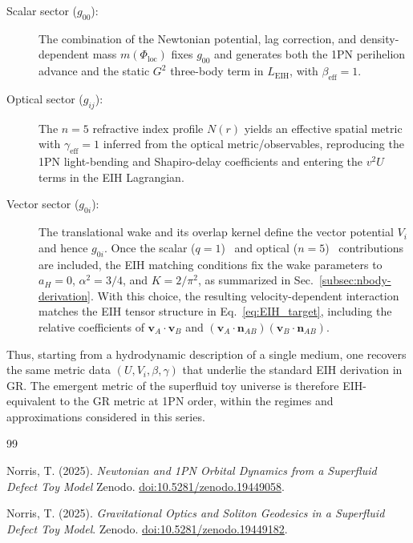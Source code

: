 \documentclass[11pt]{article}
\begin{document}
\begin{description}
  \item[Scalar sector ($g_{00}$):]
    The combination of the Newtonian potential, lag correction, and
    density-dependent mass $m(\Phi_{\text{loc}})$ fixes $g_{00}$ and
    generates both the 1PN perihelion advance and the static $G^2$
    three-body term in $L_{\text{EIH}}$, with $\beta_{\text{eff}}=1$.

  \item[Optical sector ($g_{ij}$):]
    The $n=5$ refractive index profile $N(r)$ yields an effective
    spatial metric with $\gamma_{\text{eff}}=1$ inferred from the optical
    metric/observables, reproducing the 1PN light-bending and
    Shapiro-delay coefficients and entering the $v^2 U$ terms in the
    EIH Lagrangian.

  \item[Vector sector ($g_{0i}$):]
    The translational wake and its overlap kernel define the vector potential
    $V_i$ and hence $g_{0i}$. Once the scalar ($q=1$)~\cite{Norris:2025Orbits} and optical
    ($n=5$)~\cite{Norris:Paper2} contributions are included, the EIH matching conditions
    fix the wake parameters to $a_H=0$, $\alpha^2=3/4$, and $K=2/\pi^2$, as
    summarized in Sec.~\ref{subsec:nbody-derivation}. With this choice, the
    resulting velocity-dependent interaction matches the EIH tensor structure
    in Eq.~\eqref{eq:EIH_target}, including the relative coefficients of
    $\mathbf{v}_A\cdot\mathbf{v}_B$ and
    $(\mathbf{v}_A\cdot\mathbf{n}_{AB})(\mathbf{v}_B\cdot\mathbf{n}_{AB})$.
\end{description}

Thus, starting from a hydrodynamic description of a single medium,
one recovers the same metric data $(U,V_i,\beta,\gamma)$ that
underlie the standard EIH derivation in GR.
The emergent metric of the superfluid toy universe is therefore
EIH-equivalent to the GR metric at 1PN order, within the regimes and
approximations considered in this series.

\begin{thebibliography}{99}

Norris, T. (2025).
\newblock \emph{Newtonian and 1PN Orbital Dynamics from a Superfluid Defect Toy Model}
\newblock Zenodo.
\newblock \href{https://doi.org/10.5281/zenodo.19449058}{doi:10.5281/zenodo.19449058}.

Norris, T. (2025).
\newblock \emph{Gravitational Optics and Soliton Geodesics in a Superfluid Defect Toy Model}.
\newblock Zenodo.
\newblock \href{https://doi.org/10.5281/zenodo.19449182}{doi:10.5281/zenodo.19449182}.

\end{thebibliography}
\end{document}
